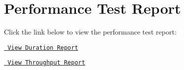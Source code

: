 \chapter{Performance Test Report}
\hypertarget{md_src_2site_2markdown_2performance}{}\label{md_src_2site_2markdown_2performance}
\label{md_src_2site_2markdown_2performance_autotoc_md0}%
%
 Click the link below to view the performance test report\+:


\begin{DoxyItemize}
\item \href{./reports/duration-perf-report.html}{\texttt{ View Duration Report}}
\item \href{./reports/throughput-perf-report.html}{\texttt{ View Throughput Report}} 
\end{DoxyItemize}